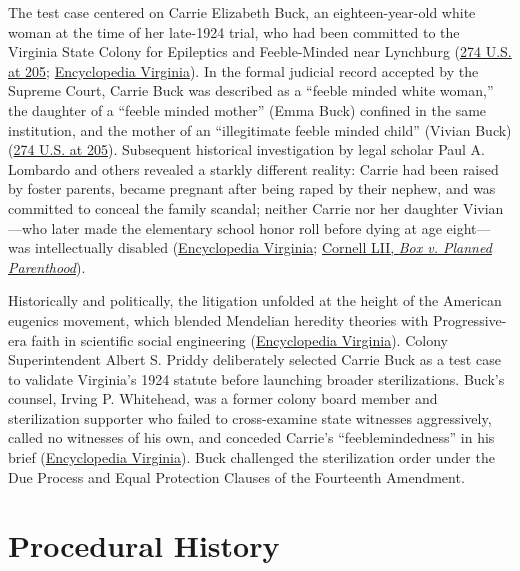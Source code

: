 \documentclass[12pt]{article}
\begin{document}
The test case centered on Carrie Elizabeth Buck, an eighteen-year-old white woman at the time of her late-1924 trial, who had been committed to the Virginia State Colony for Epileptics and Feeble-Minded near Lynchburg (\href{https://supreme.justia.com/cases/federal/us/274/200/}{274 U.S. at 205}; \href{https://encyclopediavirginia.org/entries/buck-v-bell-1927/}{Encyclopedia Virginia}). In the formal judicial record accepted by the Supreme Court, Carrie Buck was described as a ``feeble minded white woman,'' the daughter of a ``feeble minded mother'' (Emma Buck) confined in the same institution, and the mother of an ``illegitimate feeble minded child'' (Vivian Buck) (\href{https://supreme.justia.com/cases/federal/us/274/200/}{274 U.S. at 205}). Subsequent historical investigation by legal scholar Paul A. Lombardo and others revealed a starkly different reality: Carrie had been raised by foster parents, became pregnant after being raped by their nephew, and was committed to conceal the family scandal; neither Carrie nor her daughter Vivian---who later made the elementary school honor roll before dying at age eight---was intellectually disabled (\href{https://encyclopediavirginia.org/entries/buck-v-bell-1927/}{Encyclopedia Virginia}; \href{https://www.law.cornell.edu/supremecourt/text/18-483}{Cornell LII, \textit{Box v. Planned Parenthood}}).

Historically and politically, the litigation unfolded at the height of the American eugenics movement, which blended Mendelian heredity theories with Progressive-era faith in scientific social engineering (\href{https://encyclopediavirginia.org/entries/buck-v-bell-1927/}{Encyclopedia Virginia}). Colony Superintendent Albert S. Priddy deliberately selected Carrie Buck as a test case to validate Virginia's 1924 statute before launching broader sterilizations. Buck's counsel, Irving P. Whitehead, was a former colony board member and sterilization supporter who failed to cross-examine state witnesses aggressively, called no witnesses of his own, and conceded Carrie's ``feeblemindedness'' in his brief (\href{https://encyclopediavirginia.org/entries/buck-v-bell-1927/}{Encyclopedia Virginia}). Buck challenged the sterilization order under the Due Process and Equal Protection Clauses of the Fourteenth Amendment.

\section{Procedural History}
\end{document}
